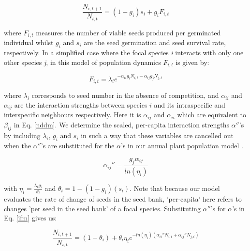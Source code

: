 \documentclass[a4,12pt]{article}
\begin{document}
            \begin{equation}
                \frac{N_{i, t+1}}{N_{i, t}} = \left( 1 - g_{i} \right) s_{i} + g_{i}F_{i, t}
                \label{ifm}
            \end{equation}
        
        where \(F_{i,t}\) measures the number of viable seeds produced per germinated individual whilst \(g_{i}\) and \(s_{i}\) are the seed germination and seed survival rate, respectively. In a simplified case where the focal species \textit{i} interacts with only one other species \textit{j}, in this model of population dynamics \(F_{i,t}\) is given by:

            \begin{equation}
                F_{i,t} = \lambda_{i} e^{- \alpha_{ii} g_{i} N_{i, t} -  \alpha_{ij} g_{j} N_{j, t} }
                \label{fecundity}   
            \end{equation}

        where \(\lambda_{i}\) corresponds to seed number in the absence of competition, and \(\alpha_{ii}\) and \(\alpha_{ij}\) are the interaction strengths between species \(i\) and its intraspecific and interspecific neighbours respectively. Here it is \(\alpha_{ij}\) and \(\alpha_{ii}\) which are equivalent to \(\beta_{ij}\) in Eq. \ref{nddm}. 
        We determine the scaled, per-capita interaction strengths ${\alpha}''$'s by including \(\lambda_{i}\), \(g_{i}\) and \(s_{i}\) in such a way that these variables are cancelled out when the ${\alpha}''$'s are substituted for the $\alpha$'s in our annual plant population model \parencite{Godoy2014, Bimler2018}. 

        \begin{equation}
            {\alpha_{ij}}'' = \frac{g_{j} \alpha_{ij}}{ln(\eta_{i})}
        \end{equation}

        with $\eta_{i} = \frac{\lambda_{i} g_{i}}{\theta_{i}}$ and $\theta_{i} = 1 - (1 - g_{i})(s_{i})$. %
        Note that because our model evaluates the rate of change of seeds in the seed bank, 'per-capita' here refers to changes 'per seed in the seed bank' of a focal species. Substituting ${\alpha}''$'s for $\alpha$'s in Eq. \ref{ifm} gives us: 
        
        \begin{equation}
            \frac{N_{i, t+1}}{N_{i, t}} = (1 - \theta_{i}) + \theta_{i} \eta_{i} e^{-ln(\eta_{i})({\alpha_{ii}}'' N_{i, t} + {\alpha_{ij}}'' N_{j, t})}
        \end{equation}
\end{document}
